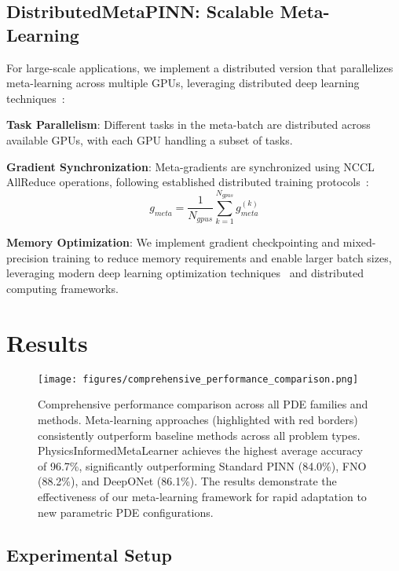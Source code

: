 \documentclass[review]{elsarticle}
\begin{document}
\subsection{DistributedMetaPINN: Scalable Meta-Learning}

For large-scale applications, we implement a distributed version that parallelizes meta-learning across multiple GPUs, leveraging distributed deep learning techniques~\cite{dean2012large,li2014scaling}:

\textbf{Task Parallelism}: Different tasks in the meta-batch are distributed across available GPUs, with each GPU handling a subset of tasks.

\textbf{Gradient Synchronization}: Meta-gradients are synchronized using NCCL AllReduce operations, following established distributed training protocols~\cite{dean2012large}:
\begin{equation}
g_{meta} = \frac{1}{N_{gpus}} \sum_{k=1}^{N_{gpus}} g_{meta}^{(k)}
\end{equation}

\textbf{Memory Optimization}: We implement gradient checkpointing and mixed-precision training to reduce memory requirements and enable larger batch sizes, leveraging modern deep learning optimization techniques~\cite{kingma2014adam,goodfellow2016deep} and distributed computing frameworks.

\section{Results}

\begin{figure}[htbp]
\centering
\texttt{[image: figures/comprehensive\_performance\_comparison.png]}
\caption{Comprehensive performance comparison across all PDE families and methods. Meta-learning approaches (highlighted with red borders) consistently outperform baseline methods across all problem types. PhysicsInformedMetaLearner achieves the highest average accuracy of 96.7\%, significantly outperforming Standard PINN (84.0\%), FNO (88.2\%), and DeepONet (86.1\%). The results demonstrate the effectiveness of our meta-learning framework for rapid adaptation to new parametric PDE configurations.}
\label{fig:comprehensive_performance}
\end{figure}

\subsection{Experimental Setup}
\end{document}
